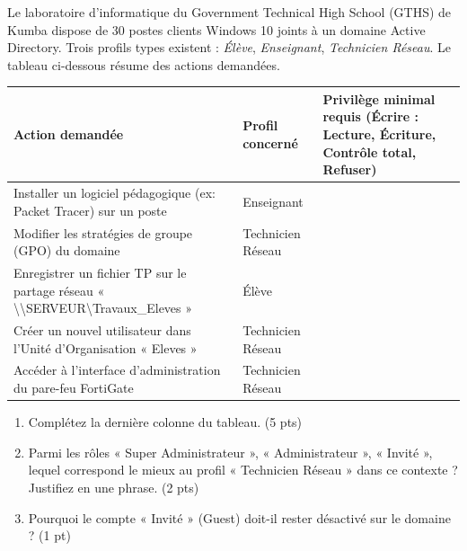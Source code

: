 \documentclass[11pt]{article}
\begin{document}
\begin{exercice}
Le laboratoire d'informatique du Government Technical High School (GTHS) de Kumba dispose de 30 postes clients Windows 10 joints à un domaine Active Directory. Trois profils types existent : \textit{Élève}, \textit{Enseignant}, \textit{Technicien Réseau}. Le tableau ci-dessous résume des actions demandées.
\begin{center}
\begin{tabular}{|p{3.5cm}|p{4cm}|p{4cm}|}
\hline
\textbf{Action demandée} & \textbf{Profil concerné} & \textbf{Privilège minimal requis (Écrire : Lecture, Écriture, Contrôle total, Refuser)} \\
\hline
Installer un logiciel pédagogique (ex: Packet Tracer) sur un poste & Enseignant & \\
\hline
Modifier les stratégies de groupe (GPO) du domaine & Technicien Réseau & \\
\hline
Enregistrer un fichier TP sur le partage réseau « \textbackslash\textbackslash SERVEUR\textbackslash Travaux\_Eleves » & Élève & \\
\hline
Créer un nouvel utilisateur dans l'Unité d'Organisation « Eleves » & Technicien Réseau & \\
\hline
Accéder à l'interface d'administration du pare-feu FortiGate & Technicien Réseau & \\
\hline
\end{tabular}
\end{center}
\begin{enumerate}
    \item Complétez la dernière colonne du tableau. \hfill (5 pts)
    \item Parmi les rôles « Super Administrateur », « Administrateur », « Invité », lequel correspond le mieux au profil « Technicien Réseau » dans ce contexte ? Justifiez en une phrase. \hfill (2 pts)
    \item Pourquoi le compte « Invité » (Guest) doit-il rester désactivé sur le domaine ? \hfill (1 pt)
\end{enumerate}
\end{exercice}
\end{document}

